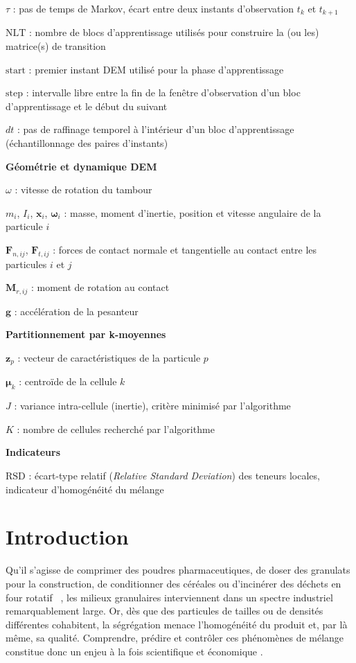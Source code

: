\documentclass[french]{MemoireMaster}
\begin{document}
$\tau$ : pas de temps de Markov, écart entre deux instants d'observation $t_k$ et $t_{k+1}$

$\mathrm{NLT}$ : nombre de blocs d'apprentissage utilisés pour construire la (ou les) matrice(s) de transition

$\mathrm{start}$ : premier instant DEM utilisé pour la phase d'apprentissage

$\mathrm{step}$ : intervalle libre entre la fin de la fenêtre d'observation d'un bloc d'apprentissage et le début du suivant

$dt$ : pas de raffinage temporel à l'intérieur d'un bloc d'apprentissage (échantillonnage des paires d'instants)

\noindent\textbf{Géométrie et dynamique DEM}

$\omega$ : vitesse de rotation du tambour

$m_i$, $I_i$, $\mathbf{x}_i$, $\boldsymbol{\omega}_i$ : masse, moment d'inertie, position et vitesse angulaire de la particule $i$

$\mathbf{F}_{n,ij}$, $\mathbf{F}_{t,ij}$ : forces de contact normale et tangentielle au contact entre les particules $i$ et $j$

$\mathbf{M}_{r,ij}$ : moment de rotation au contact

$\mathbf{g}$ : accélération de la pesanteur

\noindent\textbf{Partitionnement par k-moyennes}

$\mathbf{z}_p$ : vecteur de caractéristiques de la particule $p$

$\boldsymbol{\mu}_k$ : centroïde de la cellule $k$

$J$ : variance intra-cellule (inertie), critère minimisé par l'algorithme

$K$ : nombre de cellules recherché par l'algorithme

\noindent\textbf{Indicateurs}

$\mathrm{RSD}$ : écart-type relatif (\textit{Relative Standard Deviation}) des teneurs locales, indicateur d'homogénéité du mélange


\section{Introduction}
Qu'il s'agisse de comprimer des poudres pharmaceutiques, de doser des granulats pour la construction, de conditionner des céréales ou d'incinérer des déchets en four rotatif ~\cite{ndiaye2010}, les milieux granulaires interviennent dans un spectre industriel remarquablement large. 
Or, dès que des particules de tailles ou de densités différentes cohabitent, la ségrégation menace l'homogénéité du produit et, par là même, sa qualité. 
Comprendre, prédire et contrôler ces phénomènes de mélange constitue donc un enjeu à la fois scientifique et économique .
\end{document}
